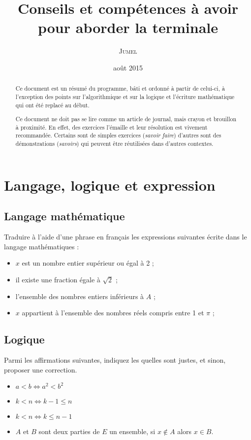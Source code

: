 \documentclass[a4paper,12pt,french]{article}
\title{Conseils et compétences à avoir pour aborder la terminale}
\author{\textsc{Jumel}}
\date{août 2015}
\begin{document}
\maketitle

\begin{abstract}
  Ce document est un résumé du programme, bâti et ordonné à partir de
  celui-ci, à l'exception des points sur l'algorithmique et sur la
  logique et l'écriture mathématique qui ont été replacé au début.

  Ce document ne doit pas se lire comme un article de journal, mais
  crayon et brouillon à proximité. En effet, des exercices l'émaille et
  leur résolution est vivement recommandée. Certains sont de simples
  exercices (\emph{savoir faire}) d'autres sont des démonstrations
  (\emph{savoirs}) qui peuvent être réutilisées dans d'autres contextes.
\end{abstract}

\tableofcontents

\pagebreak

\section{Langage, logique et expression}

\subsection{Langage mathématique}

Traduire à l'aide d'une phrase en français les expressions suivantes
écrite dans le langage mathématiques :
\begin{itemize}
  \item $x$ est un nombre entier supérieur ou égal à 2 ;
  \item il existe une fraction égale à $\sqrt{2}$ ;
  \item l'ensemble des nombres entiers inférieurs à $A$ ;
  \item $x$ appartient à l'ensemble des nombres réels compris entre 1 et
    $\pi$ ;
\end{itemize}

\subsection{Logique}

Parmi les affirmations suivantes, indiquez les quelles sont justes, et
sinon, proposer une correction.
\begin{itemize}
  \item $a<b \iff a^2 < b^2$
  \item $k < n \iff k - 1 \leqslant n$
  \item $k < n \iff k \leqslant n - 1$
  \item $A$ et $B$ sont deux parties de $E$ un ensemble, si $x \not\in
    A$ alors $x\in B$.
\end{itemize}
\end{document}

